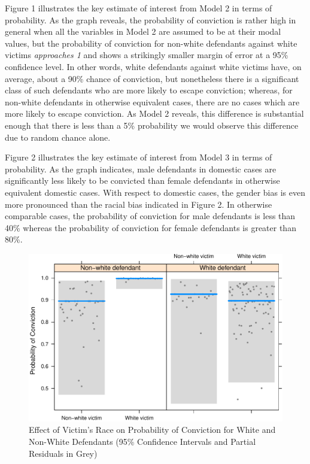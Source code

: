 \documentclass[12pt,article]{article}
\begin{document}
\pagebreak

Figure 1 illustrates the key estimate of interest from Model 2 in terms
of probability. As the graph reveals, the probability of conviction is
rather high in general when all the variables in Model 2 are assumed to
be at their modal values, but the probability of conviction for
non-white defendants against white victims \emph{approaches 1} and shows
a strikingly smaller margin of error at a 95\% confidence level. In
other words, white defendants against white victims have, on average,
about a 90\% chance of conviction, but nonetheless there is a
significant class of such defendants who are more likely to escape
conviction; whereas, for non-white defendants in otherwise equivalent
cases, there are no cases which are more likely to escape conviction. As
Model 2 reveals, this difference is substantial enough that there is
less than a 5\% probability we would observe this difference due to
random chance alone.

Figure 2 illustrates the key estimate of interest from Model 3 in terms
of probability. As the graph indicates, male defendants in domestic
cases are significantly less likely to be convicted than female
defendants in otherwise equivalent domestic cases. With respect to
domestic cases, the gender bias is even more pronounced than the racial
bias indicated in Figure 2. In otherwise comparable cases, the
probability of conviction for male defendants is less than 40\% whereas
the probability of conviction for female defendants is greater than
80\%.

\begin{figure}[htbp]
\centering
\includegraphics{stand_your_ground_article_files/figure-latex/unnamed-chunk-3.pdf}
\caption{Effect of Victim's Race on Probability of Conviction for White
and Non-White Defendants (95\% Confidence Intervals and Partial
Residuals in Grey)}
\end{figure}
\end{document}

